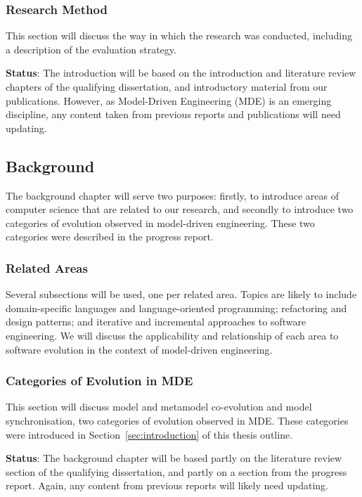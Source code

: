 \subsubsection{Research Method}
This section will discuss the way in which the research was conducted, including a description of the evaluation strategy.

\textbf{Status}: The introduction will be based on the introduction and literature review chapters of the qualifying dissertation, and introductory material from our publications. However, as Model-Driven Engineering (MDE) is an emerging discipline, any content taken from previous reports and publications will need updating.


\subsection{Background}
The background chapter will serve two purposes: firstly, to introduce areas of computer science that are related to our research, and secondly to introduce two categories of evolution observed in model-driven engineering. These two categories were described in the progress report.

\subsubsection{Related Areas}
Several subsections will be used, one per related area. Topics are likely to include domain-specific languages and language-oriented programming; refactoring and design patterns; and iterative and incremental approaches to software engineering. We will discuss the applicability and relationship of each area to software evolution in the context of model-driven engineering.

\subsubsection{Categories of Evolution in MDE}
This section will discuss model and metamodel co-evolution and model synchronisation, two categories of evolution observed in MDE. These categories were introduced in Section~\ref{sec:introduction} of this thesis outline.

\textbf{Status}: The background chapter will be based partly on the literature review section of the qualifying dissertation, and partly on a section from the progress report. Again, any content from previous reports will likely need updating.


